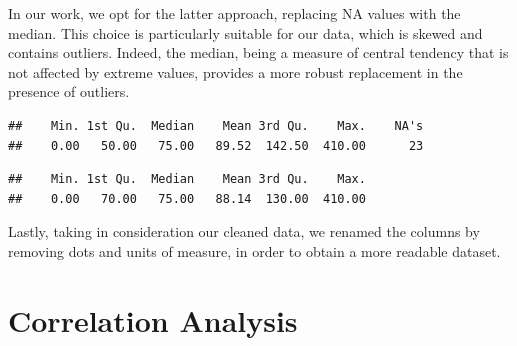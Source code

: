 \documentclass[
]{article}
\newenvironment{Shaded}{\begin{snugshade}}{\end{snugshade}}
\newcommand{\AttributeTok}[1]{\textcolor[rgb]{0.13,0.29,0.53}{#1}}
\newcommand{\CommentTok}[1]{\textcolor[rgb]{0.56,0.35,0.01}{\textit{#1}}}
\newcommand{\ConstantTok}[1]{\textcolor[rgb]{0.56,0.35,0.01}{#1}}
\newcommand{\FunctionTok}[1]{\textcolor[rgb]{0.13,0.29,0.53}{\textbf{#1}}}
\newcommand{\NormalTok}[1]{#1}
\newcommand{\OtherTok}[1]{\textcolor[rgb]{0.56,0.35,0.01}{#1}}
\newcommand{\SpecialCharTok}[1]{\textcolor[rgb]{0.81,0.36,0.00}{\textbf{#1}}}
\begin{document}
In our work, we opt for the latter approach, replacing NA values with
the median. This choice is particularly suitable for our data, which is
skewed and contains outliers. Indeed, the median, being a measure of
central tendency that is not affected by extreme values, provides a more
robust replacement in the presence of outliers.

\begin{Shaded}
\end{Shaded}

\begin{verbatim}
##    Min. 1st Qu.  Median    Mean 3rd Qu.    Max.    NA's 
##    0.00   50.00   75.00   89.52  142.50  410.00      23
\end{verbatim}

\begin{Shaded}
\end{Shaded}

\begin{verbatim}
##    Min. 1st Qu.  Median    Mean 3rd Qu.    Max. 
##    0.00   70.00   75.00   88.14  130.00  410.00
\end{verbatim}

Lastly, taking in consideration our cleaned data, we renamed the columns
by removing dots and units of measure, in order to obtain a more
readable dataset.

\hypertarget{correlation-analysis}{%
\section{Correlation Analysis}\label{correlation-analysis}}
\end{document}
